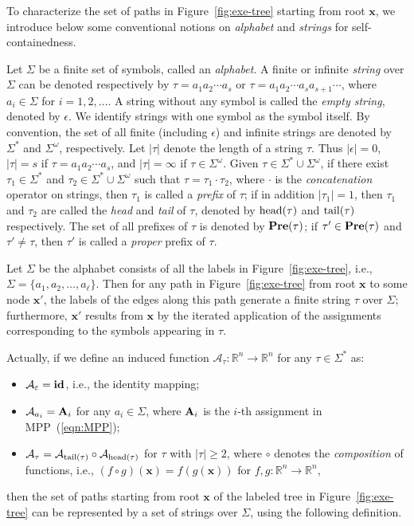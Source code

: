 \documentclass{jssc}
\newcommand{\head}{{\rm head}}
\newcommand{\tail}{{\rm tail}}
\newcommand{\A}{\mathcal{A}}
\newcommand{\xx}{\mathbf{x}}
\begin{document}
To characterize the set of paths in Figure~\ref{fig:exe-tree} starting from root $\xx$, we introduce below some conventional notions on \emph{alphabet} and \emph{strings} for self-containedness.

Let $\Sigma$ be a finite set of symbols, called an \emph{alphabet}. A finite or infinite \emph{string} over $\Sigma$ can be denoted respectively by $\tau=a_1a_2 \cdots a_s$ or $\tau=a_1a_2 \cdots a_s a_{s+1} \cdots$, where $a_i \in \Sigma$ for $i=1,2,\ldots$. A string without any symbol is called the \emph{empty string}, denoted by $\epsilon$. We identify strings with one symbol as the symbol itself. By convention, the set of all finite (including $\epsilon$) and infinite strings are denoted by $\Sigma^*$ and $\Sigma^{\omega}$, respectively.
Let $|\tau|$ denote the length of a string $\tau$. Thus $|\epsilon|=0$, $|\tau|=s$ if $\tau=a_1 a_2 \cdots a_s$, and $|\tau|=\infty$ if $\tau \in \Sigma^{\omega}$. Given $\tau \in \Sigma^* \cup \Sigma^{\omega}$, if there exist $\tau_1 \in \Sigma^*$ and $\tau_2 \in \Sigma^* \cup \Sigma^{\omega}$ such that $\tau = \tau_1 \cdot \tau_2$, where $\cdot$ is the \emph{concatenation} operator on strings, then $\tau_1$ is called a \emph{prefix} of $\tau$; if in addition $|\tau_1|=1$, then $\tau_1$ and $\tau_2$ are called the \emph{head} and \emph{tail} of $\tau$, denoted by $\head(\tau)$ and $\tail(\tau)$ respectively. The set of all prefixes of $\tau$ is denoted by ${\bf Pre}(\tau)$; if $\tau' \in {\bf Pre} (\tau)$ and $\tau' \neq \tau$, then $\tau'$ is called a \emph{proper} prefix of $\tau$.

Let $\Sigma$ be the alphabet consists of all the labels in Figure~\ref{fig:exe-tree}, i.e., $\Sigma=\{a_1,a_2,\ldots,a_{\ell}\}$. Then for any path in Figure~\ref{fig:exe-tree} from root $\xx$ to some node $\xx'$, the labels of the edges along this path generate a finite string $\tau$ over $\Sigma$; furthermore, $\xx'$ results from $\xx$ by the iterated application of the assignments corresponding to the symbols appearing in $\tau$.

Actually, if we define an induced function $\A_{\tau}: \mathbb{R}^n \rightarrow \mathbb{R}^n$ for any $\tau\in \Sigma^*$ as:
\begin{itemize}
\item $\A_{\epsilon}={\bf id}$, i.e., the identity mapping;
\item $\A_{a_i}={\bf A}_i$ for any $a_i\in \Sigma$, where ${\bf A}_i$ is the $i$-th assignment in MPP~(\ref{eqn:MPP});
\item $\A_{\tau} = \A_{\tail(\tau)} \circ \A_{\head(\tau)}$ for $\tau$ with $|\tau|\geq 2$, where $\circ$ denotes the \emph{composition} of functions, i.e., $(f \circ g)(\xx)=f(g(\xx))$ for $f,g: \mathbb{R}^n \rightarrow \mathbb{R}^n$,
\end{itemize}
then the set of paths starting from root $\xx$ of the labeled tree in Figure~\ref{fig:exe-tree} can be represented by a set of strings over $\Sigma$, using the following definition.
\end{document}
